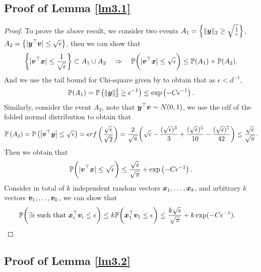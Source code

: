     \subsection{Proof of Lemma \ref{lm3.1}}
        \begin{proof}
        To prove the above result, we consider two events
$            A_1 =\left\{\Vert \boldsymbol{y}\Vert_2\geq \sqrt{\frac{1}{\epsilon}}\right\}$, $A_2=\left\{|\boldsymbol{y}^\top\boldsymbol{v}|\leq \sqrt{\epsilon}\right\}$, then we can show that
        \begin{align*}
           \left\{ |\boldsymbol{v}^\top\boldsymbol{x}|\leq\frac{1}{\sqrt\epsilon}\right\}\subset A_1\cup A_2\quad\Rightarrow\quad\mathbb{P}{\bigg (}|\boldsymbol{v}^\top\boldsymbol{x}|\leq\sqrt{\epsilon}{\bigg )}\leq\mathbb{P}(A_1)+\mathbb{P}(A_2).
        \end{align*}
        And we use the tail bound for Chi-square given by \citep{laurent2000adaptive} to obtain that as $\epsilon<d^{-1}$,
        \begin{align*}
            \mathbb{P}(A_1) = \mathbb{P}\left(\Vert\boldsymbol{y}\Vert_2^2\geq \epsilon^{-1}\right)\leq\exp\left(-C\epsilon^{-1}\right).
        \end{align*}
        Similarly, consider the event $A_2$, note that $\boldsymbol{y}^\top\boldsymbol{v}\sim N(0,1)$, we use the cdf of the folded normal distribution to obtain that
        \begin{align*}
            \mathbb{P}\left(A_2\right) = \mathbb{P}\left(\left|\boldsymbol{v}^\top\boldsymbol{y}\right|\leq\sqrt{\epsilon}\right)=erf\left(\frac{\sqrt\epsilon}{\sqrt 2}\right)=\frac{2}{\sqrt{\pi}}{\bigg (} \sqrt\epsilon-\frac{(\sqrt\epsilon)^3}{3}+\frac{(\sqrt\epsilon)^5}{10}-\frac{(\sqrt\epsilon)^7}{42}{\bigg )}\leq\frac{\sqrt\epsilon}{\sqrt{\pi}}.
        \end{align*}
        Then we obtain that 
        \begin{align*}
            \mathbb{P}{\bigg (}|\boldsymbol{v}^\top\boldsymbol{x}|\leq\sqrt\epsilon{\bigg )}\leq \frac{\sqrt\epsilon}{\sqrt{\pi}}+\exp\left(-C\epsilon^{-1}\right).
        \end{align*}
        Consider in total of $k$ independent random vectors $\boldsymbol{x}_1,\ldots,\boldsymbol{x}_k$, and arbitrary $k$ vectors $\boldsymbol{v}_1,\ldots,\boldsymbol{v}_k$, we can show that
        \begin{align*}
            \mathbb{P}{\bigg (}\exists i\text{ such that }&\boldsymbol{x}_i^\top\boldsymbol{v}_i\leq\epsilon{\bigg )}\leq k\mathbb{P}{\bigg (}\boldsymbol{x}_1^\top\boldsymbol{v}_1\leq\epsilon{\bigg )}\leq\frac{k\sqrt{\epsilon}}{\sqrt{\pi}}+k\exp(-C\epsilon^{-1}).
        \end{align*}
    \end{proof}

\subsection{Proof of Lemma \ref{lm3.2}}

